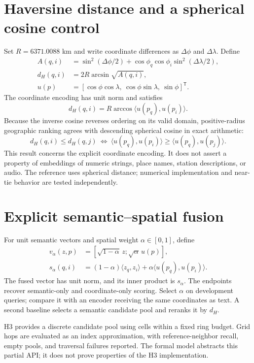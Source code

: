 \documentclass[10pt]{article}
\begin{document}
\section{Haversine distance and a spherical cosine control}
Set $R=6371.0088$ km and write coordinate differences as $\Delta\phi$ and $\Delta\lambda$. Define
\begin{align}
A(q,i)&=\sin^2(\Delta\phi/2)+\cos\phi_q\cos\phi_i\sin^2(\Delta\lambda/2),\\
d_H(q,i)&=2R\arcsin\sqrt{A(q,i)},\\
u(p)&=[\cos\phi\cos\lambda,\ \cos\phi\sin\lambda,\ \sin\phi]^{\mathsf T}.
\end{align}
The coordinate encoding has unit norm and satisfies
\begin{equation}
d_H(q,i)=R\arccos\langle u(p_q),u(p_i)\rangle.
\end{equation}
Because the inverse cosine reverses ordering on its valid domain, positive-radius geographic ranking agrees with descending spherical cosine in exact arithmetic:
\begin{equation}
d_H(q,i)\leq d_H(q,j)\ \Longleftrightarrow\
\langle u(p_q),u(p_i)\rangle\geq\langle u(p_q),u(p_j)\rangle.
\end{equation}
This result concerns the explicit coordinate encoding. It does not assert a property of embeddings of numeric strings, place names, station descriptions, or audio. The reference uses spherical distance; numerical implementation and near-tie behavior are tested independently.

\section{Explicit semantic--spatial fusion}
For unit semantic vectors and spatial weight $\alpha\in[0,1]$, define
\begin{align}
v_\alpha(z,p)&=[\sqrt{1-\alpha}\,z;\sqrt\alpha\,u(p)],\\
s_\alpha(q,i)&=(1-\alpha)\langle z_q,z_i\rangle+
\alpha\langle u(p_q),u(p_i)\rangle.
\end{align}
The fused vector has unit norm, and its inner product is $s_\alpha$. The endpoints recover semantic-only and coordinate-only scoring. Select $\alpha$ on development queries; compare it with an encoder receiving the same coordinates as text. A second baseline selects a semantic candidate pool and reranks it by $d_H$.

H3 provides a discrete candidate pool using cells within a fixed ring budget. Grid hops are evaluated as an index approximation, with reference-neighbor recall, empty pools, and traversal failures reported. The formal model abstracts this partial API; it does not prove properties of the H3 implementation.
\end{document}
